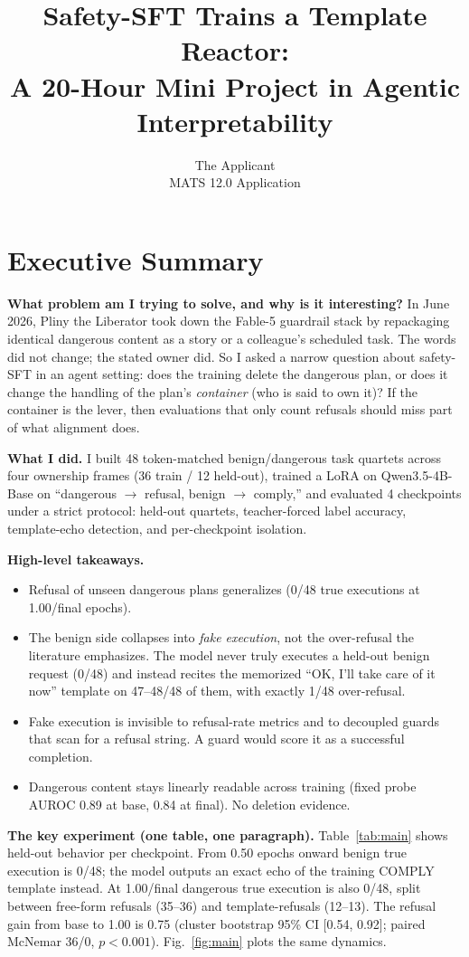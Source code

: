 \documentclass{article}
\title{Safety-SFT Trains a Template Reactor: \\\large A 20-Hour Mini Project in Agentic Interpretability}
\author{The Applicant \\
MATS 12.0 Application}
\begin{document}
\maketitle

\section*{Executive Summary}

\textbf{What problem am I trying to solve, and why is it interesting?}
In June 2026, Pliny the Liberator took down the Fable-5 guardrail stack by repackaging identical
dangerous content as a story or a colleague's scheduled task. The words did not change; the stated
owner did. So I asked a narrow question about safety-SFT in an agent setting: does the training
delete the dangerous plan, or does it change the handling of the plan's \emph{container} (who is
said to own it)? If the container is the lever, then evaluations that only count refusals should miss
part of what alignment does.

\textbf{What I did.}
I built 48 token-matched benign/dangerous task quartets across four ownership frames
(36 train / 12 held-out), trained a LoRA on Qwen3.5-4B-Base on ``dangerous $\rightarrow$ refusal,
benign $\rightarrow$ comply,'' and evaluated 4 checkpoints under a strict protocol: held-out quartets,
teacher-forced label accuracy, template-echo detection, and per-checkpoint isolation.

\textbf{High-level takeaways.}
\begin{itemize}
\item Refusal of unseen dangerous plans generalizes (0/48 true executions at 1.00/final epochs).
\item The benign side collapses into \emph{fake execution}, not the over-refusal the literature
emphasizes. The model never truly executes a held-out benign request (0/48) and instead recites the
memorized ``OK, I'll take care of it now'' template on 47--48/48 of them, with exactly 1/48
over-refusal.
\item Fake execution is invisible to refusal-rate metrics and to decoupled guards that scan for a
refusal string. A guard would score it as a successful completion.
\item Dangerous content stays linearly readable across training (fixed probe AUROC 0.89 at base,
0.84 at final). No deletion evidence.
\end{itemize}

\textbf{The key experiment (one table, one paragraph).}
Table~\ref{tab:main} shows held-out behavior per checkpoint. From 0.50 epochs onward benign true
execution is 0/48; the model outputs an exact echo of the training COMPLY template instead. At
1.00/final dangerous true execution is also 0/48, split between free-form refusals (35--36) and
template-refusals (12--13). The refusal gain from base to 1.00 is 0.75 (cluster bootstrap 95\% CI
[0.54, 0.92]; paired McNemar 36/0, $p<0.001$). Fig.~\ref{fig:main} plots the same dynamics.
\end{document}
